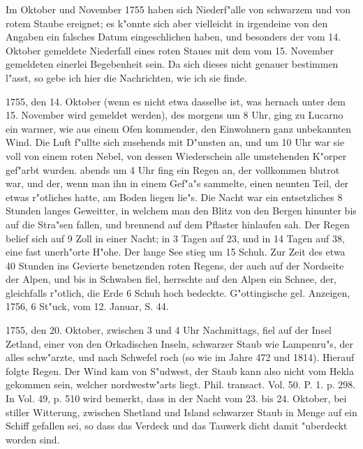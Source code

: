 \documentclass[a4paper, 11pt, oneside, polutonikogreek, german]{article}
\begin{document}
Im Oktober und November 1755 haben sich Niederf"alle von schwarzem und von rotem Staube ereignet; es k"onnte sich aber vielleicht in irgendeine von den Angaben ein falsches Datum eingeschlichen haben, und besonders der vom 14. Oktober gemeldete Niederfall eines roten Staues mit dem vom 15. November gemeldeten einerlei Begebenheit sein. Da sich dieses nicht genauer bestimmen l"asst, so gebe ich hier die Nachrichten, wie ich sie finde.

1755, den 14. Oktober (wenn es nicht etwa dasselbe ist, was hernach unter dem 15. November wird gemeldet werden), des morgens um 8 Uhr, ging zu Lucarno ein warmer, wie aus einem Ofen kommender, den Einwohnern ganz unbekannten Wind. Die Luft f"ullte sich zusehends mit D"unsten an, und um 10 Uhr war sie voll von einem roten Nebel, von dessen Wiederschein alle umstehenden K"orper gef"arbt wurden. abends um 4 Uhr fing ein Regen an, der vollkommen blutrot war, und der, wenn man ihn in einem Gef"a"s sammelte, einen neunten Teil, der etwas r"otliches hatte, am Boden liegen lie"s. Die Nacht war ein entsetzliches 8 Stunden langes Geweitter, in welchem man den Blitz von den Bergen hinunter bis auf die Stra"sen fallen, und brennend auf dem Pflaster hinlaufen sah. Der Regen belief sich auf 9 Zoll in einer Nacht; in 3 Tagen auf 23, und in 14 Tagen auf 38, eine fast unerh"orte H"ohe. Der lange See stieg um 15 Schuh. Zur Zeit des etwa 40 Stunden ins Gevierte benetzenden roten Regens, der auch auf der Nordseite der Alpen, und bis in Schwaben fiel, herrschte auf den Alpen ein Schnee, der, gleichfalls r"otlich, die Erde 6 Schuh hoch bedeckte. G"ottingische gel. Anzeigen, 1756, 6 St"uck, vom 12. Januar, S. 44.

1755, den 20. Oktober, zwischen 3 und 4 Uhr Nachmittags, fiel auf der Insel Zetland, einer von den Orkadischen Inseln, schwarzer Staub wie Lampenru"s, der alles schw"arzte, und nach Schwefel roch (so wie im Jahre 472 und 1814). Hierauf folgte Regen. Der Wind kam von S"udwest, der Staub kann also nicht vom Hekla gekommen sein, welcher nordwestw"arts liegt. Phil. transact. Vol. 50. P. 1. p. 298. In Vol. 49, p. 510 wird bemerkt, dass in der Nacht vom 23. bis 24. Oktober, bei stiller Witterung, zwischen Shetland und Island schwarzer Staub in Menge auf ein Schiff gefallen sei, so dass das Verdeck und das Tauwerk dicht damit "uberdeckt worden sind.
\end{document}
